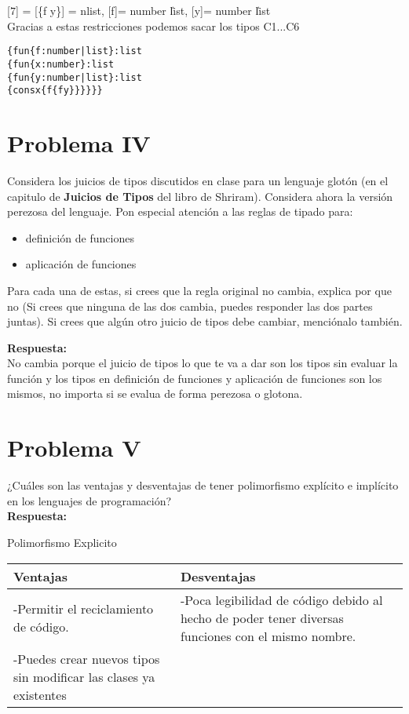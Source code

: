 \documentclass{article}
\begin{document}
[$\boxed{7}$] = [\{f y\}] = nlist, [f]= number \| list, [y]= number \| list\\


Gracias a estas restricciones podemos sacar los tipos C1...C6
\begin{alltt}
\{fun \{f : number | list \} : list
  \{fun \{x : number \} : list
    \{fun \{y : number | list \} : list
      \{cons x \{f \{f y\}\}\}\}\}\}
\end{alltt}


\section*{Problema IV}
Considera los juicios de tipos discutidos en clase para un lenguaje glotón
(en el capitulo de \textbf{Juicios de Tipos} del libro de Shriram).
Considera ahora la versión perezosa del lenguaje. Pon especial atención a
las reglas de tipado para:

\begin{itemize}
\item definición de funciones
\item aplicación de funciones
\end{itemize}

Para cada una de estas, si crees que la regla original no cambia, explica por que no
(Si crees que ninguna de las dos cambia, puedes responder las dos partes juntas).
Si crees que algún otro juicio de tipos debe cambiar, menciónalo también.

{\bf Respuesta: }\\

No cambia porque el juicio de tipos lo que te va a dar son los tipos sin evaluar la función y los tipos en definición de funciones y aplicación de funciones
son los mismos, no importa si se evalua de forma perezosa o glotona.

\section*{Problema V}
¿Cuáles son las ventajas y desventajas de tener polimorfismo explícito e implícito
en los lenguajes de programación?
\\
\textbf{Respuesta: }
\\


\begin{center}
Polimorfismo Explicito
\end{center}
\begin{tabularx}{\textwidth}{X|X}
	  \textbf{Ventajas} & \textbf{Desventajas} \\
	\hline
	-Permitir el reciclamiento de código. & -Poca legibilidad de código debido al hecho de poder tener diversas funciones con el mismo nombre. \\
	-Puedes crear nuevos tipos sin modificar las clases ya existentes & \\
\end{tabularx}
\end{document}
